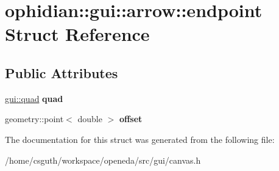 \hypertarget{structophidian_1_1gui_1_1arrow_1_1endpoint}{\section{ophidian\-:\-:gui\-:\-:arrow\-:\-:endpoint Struct Reference}
\label{structophidian_1_1gui_1_1arrow_1_1endpoint}
}
\subsection*{Public Attributes}
\begin{DoxyCompactItemize}
\item 
\hypertarget{structophidian_1_1gui_1_1arrow_1_1endpoint_aef2c25d4305c3814f7aab045fa82f6ec}{\hyperlink{structophidian_1_1gui_1_1quad}{gui\-::quad} {\bfseries quad}}\label{structophidian_1_1gui_1_1arrow_1_1endpoint_aef2c25d4305c3814f7aab045fa82f6ec}

\item 
\hypertarget{structophidian_1_1gui_1_1arrow_1_1endpoint_a6bf23baad073a20764f3fe4dcbb543c3}{geometry\-::point$<$ double $>$ {\bfseries offset}}\label{structophidian_1_1gui_1_1arrow_1_1endpoint_a6bf23baad073a20764f3fe4dcbb543c3}

\end{DoxyCompactItemize}


The documentation for this struct was generated from the following file\-:\begin{DoxyCompactItemize}
\item 
/home/csguth/workspace/openeda/src/gui/canvas.\-h\end{DoxyCompactItemize}
